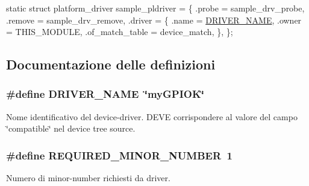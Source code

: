 \begin{DoxyCode}
\textcolor{keyword}{static} \textcolor{keyword}{struct }platform\_driver sample\_pldriver = \{
    .probe  = sample\_drv\_probe,
    .remove = sample\_drv\_remove,
    .driver = \{
        .name  = \hyperlink{group___kernel-_module_ga25634d21648ca7fb7a2aca614bafaaeb}{DRIVER\_NAME},
        .owner = THIS\_MODULE,
        .of\_match\_table = device\_match,
    \},
\};
\end{DoxyCode}
 

\subsection{Documentazione delle definizioni}
\hypertarget{group___kernel-_module_ga25634d21648ca7fb7a2aca614bafaaeb}{
\subsubsection[{D\+R\+I\+V\+E\+R\+\_\+\+N\+A\+M\+E}]{\setlength{\rightskip}{0pt plus 5cm}\#define D\+R\+I\+V\+E\+R\+\_\+\+N\+A\+M\+E~\char`\"{}my\+G\+P\+I\+O\+K\char`\"{}}}\label{group___kernel-_module_ga25634d21648ca7fb7a2aca614bafaaeb}


Nome identificativo del device-\/driver. D\+E\+V\+E corrispondere al valore del campo \char`\"{}compatible\char`\"{} nel device tree source. 

\hypertarget{group___kernel-_module_ga605a877d5e63c79a65d4a57d364680b4}{
\subsubsection[{R\+E\+Q\+U\+I\+R\+E\+D\+\_\+\+M\+I\+N\+O\+R\+\_\+\+N\+U\+M\+B\+E\+R}]{\setlength{\rightskip}{0pt plus 5cm}\#define R\+E\+Q\+U\+I\+R\+E\+D\+\_\+\+M\+I\+N\+O\+R\+\_\+\+N\+U\+M\+B\+E\+R~1}}\label{group___kernel-_module_ga605a877d5e63c79a65d4a57d364680b4}


Numero di minor-\/number richiesti da driver. 



